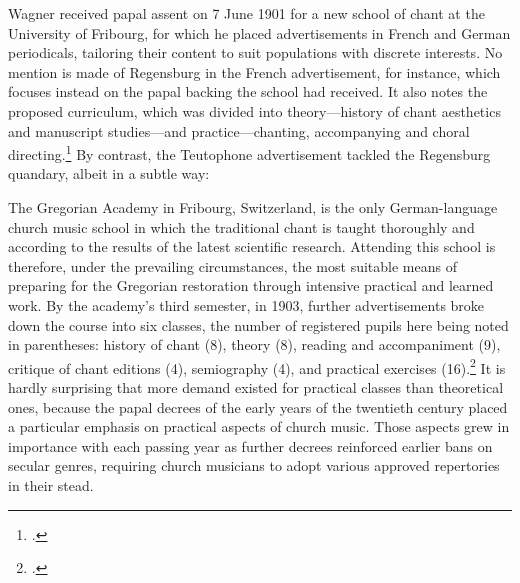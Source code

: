 Wagner received papal assent on 7 June 1901 for a new school of chant at the \mbox{University} of Fribourg, for which he placed advertisements in French and German periodicals, tailoring their content to suit populations with discrete interests.
No mention is made of Regensburg in the French advertisement, for instance, which focuses instead on the papal backing the school had received.
It also notes the proposed curriculum, which was divided into theory---history of chant aesthetics and manuscript studies---and practice---chanting, accompanying and choral directing.\footcite[Notice dated 10 August 1901 in][10]{WagnerAcademiegregorienneFribourg1901}
By contrast, the Teutophone advertisement tackled the Regensburg quandary, albeit in a subtle way:
\pagebreak{}

  {\cites[106]{WagnerGregorianischeAkademieFreiburg1904}[150]{WagnerKleinereMitteilungen1904}}
{The Gregorian Academy in Fribourg, Switzerland, is the only German-\linebreak{}language church music school in which the traditional chant is taught thoroughly and according to the results of the latest scientific research. Attending this school is therefore, under the prevailing circumstances, the most suitable means of preparing for the Gregorian restoration through intensive practical and learned work.}
\noindent
By the academy's third semester, in 1903, further advertisements broke down the course into six classes, the number of registered pupils here being noted in parentheses: history of chant (8), theory (8), reading and accompaniment (9), critique of chant editions (4), semiography (4), and practical exercises (16).\footcite[35]{WagnerGregorianischeAkademieFreiburg1903}
It is hardly surprising that more demand existed for practical classes than theoretical ones, because the papal decrees of the early years of the twentieth century placed a particular emphasis on practical aspects of church music.
Those aspects grew in importance with each passing year as further decrees reinforced earlier bans on secular genres, requiring church musicians to adopt various approved repertories in their stead.

